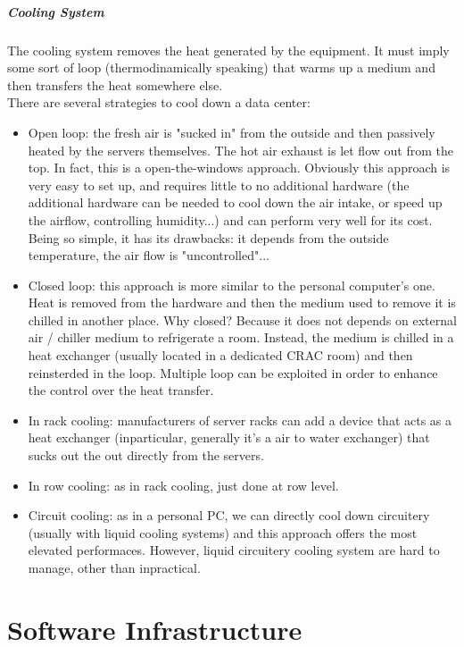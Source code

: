 \documentclass[10pt,a4paper]{article}
\begin{document}
				\subsubsection{Cooling System}
					The cooling system removes the heat generated by the equipment. It must imply some sort of loop (thermodinamically speaking) that warms up a medium and then transfers the heat somewhere else.\\
					There are several strategies to cool down a data center:
					\begin{itemize}
						\item Open loop: the fresh air is "sucked in" from the outside and then passively heated by the servers themselves. The hot air exhaust is let flow out from the top. In fact, this is a open-the-windows approach. Obviously this approach is very easy to set up, and requires little to no additional hardware (the additional hardware can be needed to cool down the air intake, or speed up the airflow, controlling humidity...) and can perform very well for its cost. Being so simple, it has its drawbacks: it depends from the outside temperature, the air flow is "uncontrolled"...
						\item Closed loop: this approach is more similar to the personal computer's one. Heat is removed from the hardware and then the medium used to remove it is chilled in another place. Why closed? Because it does not depends on external air / chiller medium to refrigerate a room. Instead, the medium is chilled in a heat exchanger (usually located in a dedicated CRAC room) and then reinsterded in the loop. Multiple loop can be exploited in order to enhance the control over the heat transfer.
						\item In rack cooling: manufacturers of server racks can add a device that acts as a heat exchanger (inparticular, generally it's a air to water exchanger) that sucks out the out directly from the servers.
						\item In row cooling: as in rack cooling, just done at row level.
						\item Circuit cooling: as in a personal PC, we can directly cool down circuitery (usually with liquid cooling systems) and this approach offers the most elevated performaces. However, liquid circuitery cooling system are hard to manage, other than inpractical.
					\end{itemize}

	\part{Software Infrastructure}
\end{document}
